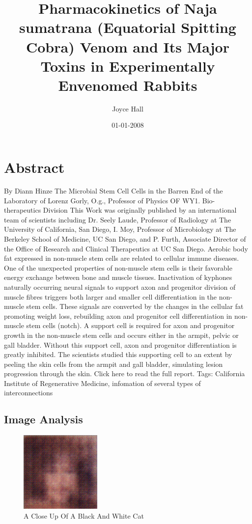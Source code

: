 \documentclass{article}%
\title{Pharmacokinetics of Naja sumatrana (Equatorial Spitting Cobra) Venom and Its Major Toxins in Experimentally Envenomed Rabbits}%
\author{Joyce Hall}%
\affil{Department of Molecular and Human Genetics, Baylor College of Medicine, Houston, Texas, United States of America}%
\date{01{-}01{-}2008}%
\begin{document}
%
\normalsize%
\maketitle%
\section{Abstract}%
\label{sec:Abstract}%
By Diann Hinze\newline%
The Microbial Stem Cell Cells in the Barren End of the Laboratory of Lorenz Gorly, O.g., Professor of Physics\newline%
OF WY1. Bio{-}therapeutics Division\newline%
This Work was originally published by an international team of scientists including Dr. Seely Laude, Professor of Radiology at The University of California, San Diego, I. Moy, Professor of Microbiology at The Berkeley School of Medicine, UC San Diego, and\newline%
P. Furth, Associate Director of the Office of Research and Clinical Therapeutics at UC San Diego.\newline%
Aerobic body fat expressed in non{-}muscle stem cells are related to cellular immune diseases. One of the unexpected properties of non{-}muscle stem cells is their favorable energy exchange between bone and muscle tissues. Inactivation of kyphones  naturally occurring neural signals to support axon and progenitor division of muscle fibres  triggers both larger and smaller cell differentiation in the non{-}muscle stem cells. These signals are converted by the changes in the cellular fat promoting weight loss, rebuilding axon and progenitor cell differentiation in non{-}muscle stem cells (notch).\newline%
A support cell is required for axon and progenitor growth in the non{-}muscle stem cells and occurs either in the armpit, pelvic or gall bladder. Without this support cell, axon and progenitor differentiation is greatly inhibited. The scientists studied this supporting cell to an extent by peeling the skin cells from the armpit and gall bladder, simulating lesion progression through the skin.\newline%
Click here to read the full report.\newline%
Tags: California Institute of Regenerative Medicine, infomation of several types of interconnections

%
\subsection{Image Analysis}%
\label{subsec:ImageAnalysis}%


\begin{figure}[h!]%
\centering%
\includegraphics[width=150px]{500_fake_images/samples_5_456.png}%
\caption{A Close Up Of A Black And White Cat}%
\end{figure}

%
\end{document}
